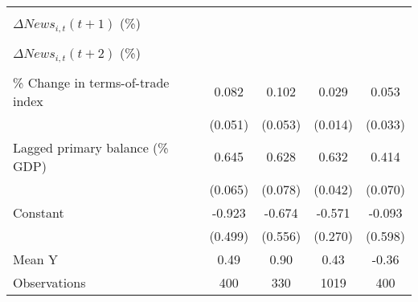 {\begin{tabular}{l*{4}{c}}
                    &                     &                     &                     &                     \\
\addlinespace
$ \Delta News_{i,t}(t+1)$ (\%)&                     &                     &                     &                     \\
                    &                     &                     &                     &                     \\
\addlinespace
$ \Delta News_{i,t}(t+2)$ (\%)&                     &                     &                     &                     \\
                    &                     &                     &                     &                     \\
\addlinespace
\% Change in terms-of-trade index&       0.082         &       0.102\sym{*}  &       0.029\sym{**} &       0.053         \\
                    &     (0.051)         &     (0.053)         &     (0.014)         &     (0.033)         \\
\addlinespace
Lagged primary balance (\% GDP)&       0.645\sym{***}&       0.628\sym{***}&       0.632\sym{***}&       0.414\sym{***}\\
                    &     (0.065)         &     (0.078)         &     (0.042)         &     (0.070)         \\
\addlinespace
Constant            &      -0.923\sym{*}  &      -0.674         &      -0.571\sym{**} &      -0.093         \\
                    &     (0.499)         &     (0.556)         &     (0.270)         &     (0.598)         \\
\midrule
Mean Y              &        0.49         &        0.90         &        0.43         &       -0.36         \\
Observations        &         400         &         330         &        1019         &         400         \\
\bottomrule
\end{tabular}
}
